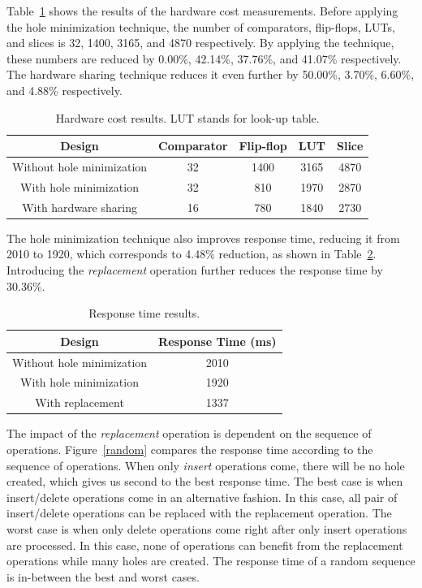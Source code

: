 \documentclass[10pt, conference, compsocconf]{IEEEtran}
\begin{document}
Table~\ref{table2} shows the results of the hardware cost measurements.
Before applying the hole minimization technique, the number of comparators, flip-flops, LUTs, and slices is 32, 1400, 3165, and 4870 respectively.
By applying the technique, these numbers are reduced by 0.00\%, 42.14\%, 37.76\%, and 41.07\% respectively.
The hardware sharing technique reduces it even further by 50.00\%, 3.70\%, 6.60\%, and 4.88\% respectively.

\begin{table}
 \begin{center}
 \caption{Hardware cost results. LUT stands for look-up table.}
\label{table2}
\begin{tabular}{|c|c|c|c|c|}
 \hline
 Design  & Comparator  & Flip-flop & LUT &Slice \\
 \hline
 \hline
Without hole minimization & 32 & 1400 & 3165 & 4870 \\
 \hline
With hole minimization & 32 & 810 & 1970 & 2870 \\
  \hline
With hardware sharing & 16 & 780 & 1840 & 2730 \\
\hline
\end{tabular}
\end{center}
\end{table}

The hole minimization technique also improves response time, reducing it from 2010 to 1920, which corresponds to 4.48\% reduction, as shown in Table~\ref{table3}.
Introducing the {\it replacement} operation further reduces the response time by 30.36\%.

\begin{table}
 \begin{center}
 \caption{Response time results.}
\label{table3}
\begin{tabular}{ |c|c|}
 \hline
 Design  &  Response Time (ms) \\
 \hline
Without hole minimization & 2010 \\
  \hline
With hole minimization & 1920 \\
  \hline
With replacement & 1337 \\
  \hline
\end{tabular}
\end{center}
\end{table}

The impact of the {\it replacement} operation is dependent on the sequence of operations.
Figure~\ref{random} compares the response time according to the sequence of operations.
When only {\it insert} operations come, there will be no hole created, which gives us second to the best response time.
The best case is when insert/delete operations come in an alternative fashion.
In this case, all pair of insert/delete operations can be replaced with the replacement operation.
The worst case is when only delete operations come right after only insert operations are processed.
In this case, none of operations can benefit from the replacement operations while many holes are created.
The response time of a random sequence is in-between the best and worst cases.
\end{document}
